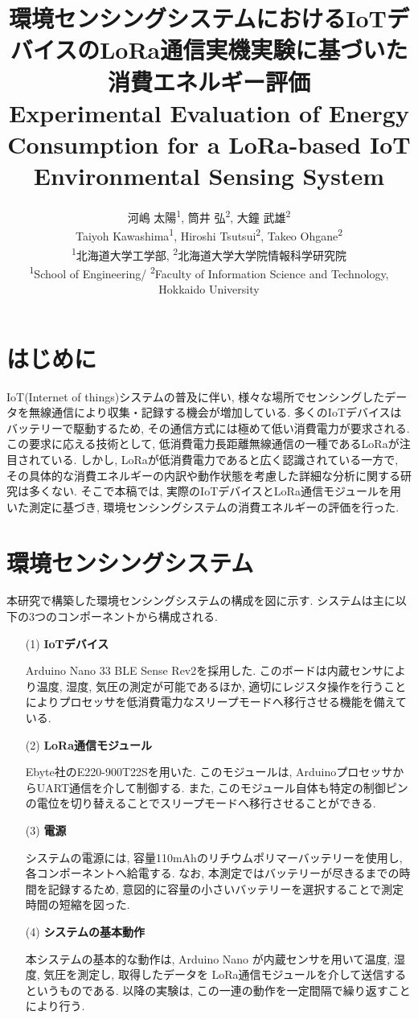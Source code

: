 \documentclass[lualatex, twocolumn]{ltjsarticle}
\title{{\bfseries 環境センシングシステムにおけるIoTデバイスのLoRa通信実機実験に基づいた消費エネルギー評価}\\
\large{Experimental Evaluation of Energy Consumption for a LoRa-based IoT Environmental Sensing System}}
\author{
    河嶋 太陽\textsuperscript{1},
    筒井 弘\textsuperscript{2},
    大鐘 武雄\textsuperscript{2}
    \\
    \normalsize
    Taiyoh Kawashima\textsuperscript{1},
    Hiroshi Tsutsui\textsuperscript{2},
    Takeo Ohgane\textsuperscript{2}
    \\
    \textsuperscript{1}北海道大学工学部,
    \textsuperscript{2}北海道大学大学院情報科学研究院
    \\
    \normalsize
    \textsuperscript{1}School of Engineering/ \textsuperscript{2}Faculty of Information Science and Technology, Hokkaido University
}
\date{}
\begin{document}
\maketitle


\section{はじめに}
 IoT(Internet of things)システムの普及に伴い, 様々な場所でセンシングしたデータを無線通信により収集・記録する機会が増加している. 
多くのIoTデバイスはバッテリーで駆動するため, その通信方式には極めて低い消費電力が要求される. 
この要求に応える技術として,  低消費電力長距離無線通信の一種であるLoRaが注目されている. 
しかし, LoRaが低消費電力であると広く認識されている一方で, その具体的な消費エネルギーの内訳や動作状態を考慮した詳細な分析に関する研究は多くない. 
そこで本稿では,  実際のIoTデバイスとLoRa通信モジュールを用いた測定に基づき, 環境センシングシステムの消費エネルギーの評価を行った. 


\section{環境センシングシステム}
 本研究で構築した環境センシングシステムの構成を図に示す. システムは主に以下の3つのコンポーネントから構成される.
\begin{enumerate}
    \item[(1)]\textbf{IoTデバイス}

    Arduino Nano 33 BLE Sense Rev2を採用した. このボードは内蔵センサにより温度, 湿度, 気圧の測定が可能であるほか, 
    適切にレジスタ操作を行うことによりプロセッサを低消費電力なスリープモードへ移行させる機能を備えている.

    \item[(2)]\textbf{LoRa通信モジュール}

    Ebyte社のE220-900T22Sを用いた. このモジュールは, ArduinoプロセッサからUART通信を介して制御する. 
    また, このモジュール自体も特定の制御ピンの電位を切り替えることでスリープモードへ移行させることができる. 

    \item[(3)]\textbf{電源}

    システムの電源には, 容量110mAhのリチウムポリマーバッテリーを使用し, 各コンポーネントへ給電する.
    なお, 本測定ではバッテリーが尽きるまでの時間を記録するため, 意図的に容量の小さいバッテリーを選択することで測定時間の短縮を図った.

    \item [(4)]\textbf{システムの基本動作}

    本システムの基本的な動作は, Arduino Nano が内蔵センサを用いて温度, 湿度, 気圧を測定し, 取得したデータを
    LoRa通信モジュールを介して送信するというものである. 
    以降の実験は, この一連の動作を一定間隔で繰り返すことにより行う. 
\end{enumerate}
\end{document}
